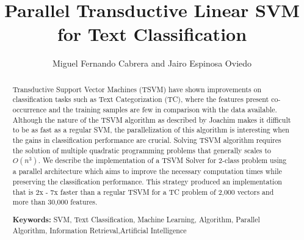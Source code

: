 




%


\title{Parallel Transductive Linear SVM for Text Classification}

\author{Miguel Fernando Cabrera and Jairo Espinosa Oviedo}



\maketitle

\begin{abstract}
Transductive Support Vector Machines (TSVM) have shown improvements
on classification tasks such as Text Categorization (TC), where the
features present co-occurrence and the training samples are few in
comparison with the data available. Although the nature of the TSVM
algorithm as described by Joachim makes it difficult to be as fast
as a regular SVM, the parallelization of this algorithm is interesting
when the gains in classification performance are crucial. Solving
TSVM algorithm requires the solution of multiple quadratic programming
problems that generally scales to $O(n^{3})$. We describe the implementation
of a TSVM Solver for 2-class problem using a parallel architecture
which aims to improve the necessary computation times while preserving
the classification performance. This strategy produced an implementation 
that is 2x - 7x faster than a regular TSVM for a TC problem of 2,000 vectors 
and more than 30,000 features.

{\bf Keywords:} SVM, Text Classification, Machine Learning, Algorithm,
Parallel Algorithm, Information Retrieval,Artificial Intelligence

\end{abstract}



